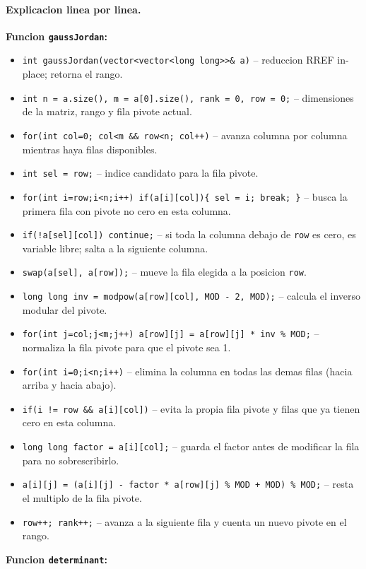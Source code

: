 \paragraph{Explicacion linea por linea.}
\textbf{Funcion \texttt{gaussJordan}:}
\begin{itemize}\setlength\itemsep{0pt}
	\item \verb|int gaussJordan(vector<vector<long long>>& a)| -- reduccion RREF in-place; retorna el rango.
	\item \verb|int n = a.size(), m = a[0].size(), rank = 0, row = 0;| -- dimensiones de la matriz, rango y fila pivote actual.
	\item \verb|for(int col=0; col<m && row<n; col++)| -- avanza columna por columna mientras haya filas disponibles.
	\item \verb|int sel = row;| -- indice candidato para la fila pivote.
	\item \verb|for(int i=row;i<n;i++) if(a[i][col]){ sel = i; break; }| -- busca la primera fila con pivote no cero en esta columna.
	\item \verb|if(!a[sel][col]) continue;| -- si toda la columna debajo de \texttt{row} es cero, es variable libre; salta a la siguiente columna.
	\item \verb|swap(a[sel], a[row]);| -- mueve la fila elegida a la posicion \texttt{row}.
	\item \verb|long long inv = modpow(a[row][col], MOD - 2, MOD);| -- calcula el inverso modular del pivote.
	\item \verb|for(int j=col;j<m;j++) a[row][j] = a[row][j] * inv % MOD;| -- normaliza la fila pivote para que el pivote sea 1.
	\item \verb|for(int i=0;i<n;i++)| -- elimina la columna en todas las demas filas (hacia arriba y hacia abajo).
	\item \verb|if(i != row && a[i][col])| -- evita la propia fila pivote y filas que ya tienen cero en esta columna.
	\item \verb|long long factor = a[i][col];| -- guarda el factor antes de modificar la fila para no sobrescribirlo.
	\item \verb|a[i][j] = (a[i][j] - factor * a[row][j] % MOD + MOD) % MOD;| -- resta el multiplo de la fila pivote.
	\item \verb|row++; rank++;| -- avanza a la siguiente fila y cuenta un nuevo pivote en el rango.
\end{itemize}
\textbf{Funcion \texttt{determinant}:}
